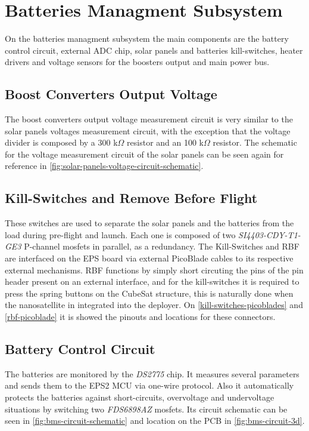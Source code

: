 \section{Batteries Managment Subsystem}

On the batteries managment subsystem the main components are the battery control circuit, external ADC chip, solar panels and batteries kill-switches, heater drivers and voltage sensors for the boosters output and main power bus. 

\subsection{Boost Converters Output Voltage}

The boost converters output voltage measurement circuit is very similar to the solar panels voltages measurement circuit, with the exception that the voltage divider is composed by a 300 k$\Omega$ resistor and an 100 k$\Omega$ resistor.
The schematic for the voltage measurement circuit of the solar panels can be seen again for reference in \autoref{fig:solar-panels-voltage-circuit-schematic}.

\subsection{Kill-Switches and Remove Before Flight}

These switches are used to separate the solar panels and the batteries from the load during pre-flight and launch. Each one is composed of two \textit{SI4403-CDY-T1-GE3} P-channel mosfets in parallel, as a redundancy.
The Kill-Switches and RBF are interfaced on the EPS board via external PicoBlade cables to its respective external mechanisms. RBF functions by simply short circuting the pins of the pin header present on an external interface\cite{iip}, and for the kill-switches it is required to press the spring buttons on the CubeSat structure, this is naturally done when the nanosatellite in integrated into the deployer.
On \autoref{kill-switches-picoblades} and \autoref{rbf-picoblade} it is showed the pinouts and locations for these connectors.

\subsection{Battery Control Circuit}

The batteries are monitored by the \textit{DS2775} chip. It measures several parameters and sends them to the EPS2 MCU via one-wire protocol. Also it automatically protects the batteries against short-circuits, overvoltage and undervoltage situations by switching two \textit{FDS6898AZ} mosfets.
Its circuit schematic can be seen in \autoref{fig:bms-circuit-schematic} and location on the PCB in \autoref{fig:bms-circuit-3d}.

